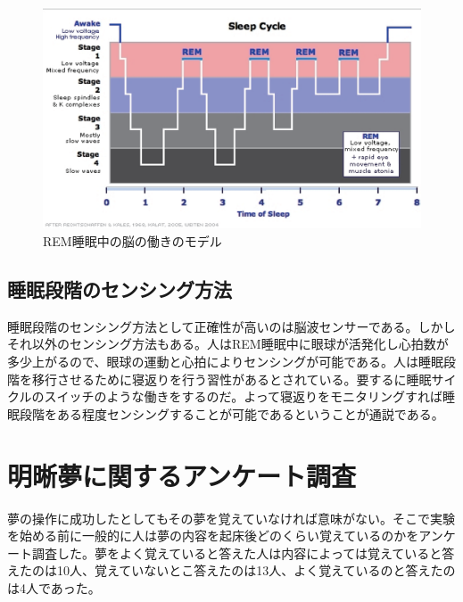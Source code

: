 \begin{figure}[htbp]
\begin{center}
\includegraphics[width=15cm]{eps/SleepHypnogram.eps}
\caption{REM睡眠中の脳の働きのモデル}
\label{SleepHypnogram}
\end{center}
\end{figure}

\subsection{睡眠段階のセンシング方法}
睡眠段階のセンシング方法として正確性が高いのは脳波センサーである。しかしそれ以外のセンシング方法もある。人はREM睡眠中に眼球が活発化し心拍数が多少上がるので、眼球の運動と心拍によりセンシングが可能である。人は睡眠段階を移行させるために寝返りを行う習性があるとされている。要するに睡眠サイクルのスイッチのような働きをするのだ。\cite{negaeri}よって寝返りをモニタリングすれば睡眠段階をある程度センシングすることが可能であるということが通説である。

\section{明晰夢に関するアンケート調査}
夢の操作に成功したとしてもその夢を覚えていなければ意味がない。そこで実験を始める前に一般的に人は夢の内容を起床後どのくらい覚えているのかをアンケート調査した。夢をよく覚えていると答えた人は内容によっては覚えていると答えたのは10人、覚えていないとこ答えたのは13人、よく覚えているのと答えたのは4人であった。


